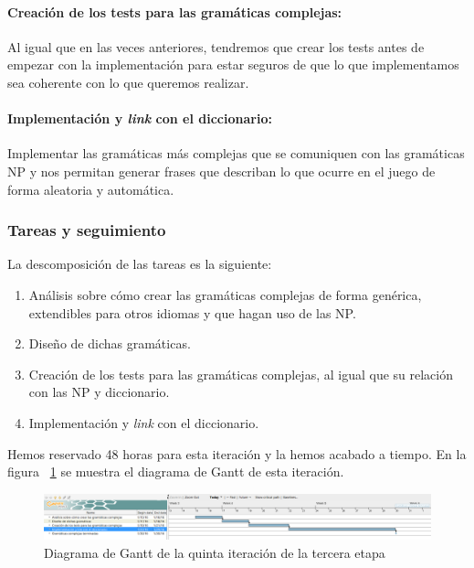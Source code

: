 \paragraph{Creación de los tests para las gramáticas complejas:} Al igual que en las veces anteriores, tendremos que crear los tests antes de empezar con la implementación para estar seguros de que lo que implementamos sea coherente con lo que queremos realizar.

\paragraph{Implementación y \textit{link} con el diccionario:} Implementar las gramáticas más complejas que se comuniquen con las gramáticas NP y nos permitan generar frases que describan lo que ocurre en el juego de forma aleatoria y automática.

\subsubsection{Tareas y seguimiento}

La descomposición de las tareas es la siguiente:

\begin{enumerate}[label=\bfseries WBS 5.\arabic*]
  \item Análisis sobre cómo crear las gramáticas complejas de forma genérica, extendibles para otros idiomas y que hagan uso de las NP.
  \item Diseño de dichas gramáticas.
  \item Creación de los tests para las gramáticas complejas, al igual que su relación con las NP y diccionario.
  \item Implementación y \textit{link} con el diccionario.
\end{enumerate}

Hemos reservado 48 horas para esta iteración y la hemos acabado a tiempo. En la figura ~\ref{fig:sec3it5} se muestra el diagrama de Gantt de esta iteración.

\begin{figure}
    \includegraphics[width=\textwidth,height=\textheight,keepaspectratio]{./img/sec3it5.png}
  \caption{Diagrama de Gantt de la quinta iteración de la tercera etapa}
  \label{fig:sec3it5}
\end{figure}

